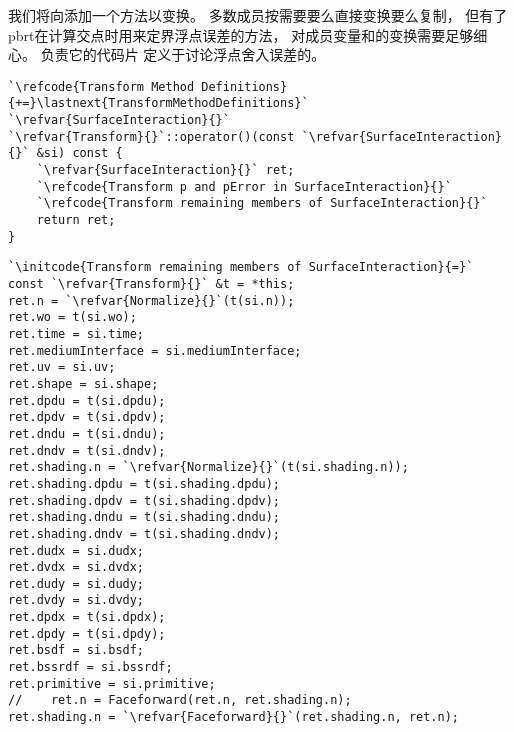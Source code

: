 我们将向添加一个方法以变换。
多数成员按需要要么直接变换要么复制，
但有了pbrt在计算交点时用来定界浮点误差的方法，
对成员变量和的变换需要足够细心。
负责它的代码片
定义于讨论浮点舍入误差的。
\begin{lstlisting}
`\refcode{Transform Method Definitions}{+=}\lastnext{TransformMethodDefinitions}`
`\refvar{SurfaceInteraction}{}`
`\refvar{Transform}{}`::operator()(const `\refvar{SurfaceInteraction}{}` &si) const {
    `\refvar{SurfaceInteraction}{}` ret;
    `\refcode{Transform p and pError in SurfaceInteraction}{}`
    `\refcode{Transform remaining members of SurfaceInteraction}{}`
    return ret; 
}
\end{lstlisting}
\begin{lstlisting}
`\initcode{Transform remaining members of SurfaceInteraction}{=}`
const `\refvar{Transform}{}` &t = *this;
ret.n = `\refvar{Normalize}{}`(t(si.n));
ret.wo = t(si.wo);
ret.time = si.time;
ret.mediumInterface = si.mediumInterface;
ret.uv = si.uv;
ret.shape = si.shape;
ret.dpdu = t(si.dpdu);
ret.dpdv = t(si.dpdv);
ret.dndu = t(si.dndu);
ret.dndv = t(si.dndv);
ret.shading.n = `\refvar{Normalize}{}`(t(si.shading.n));
ret.shading.dpdu = t(si.shading.dpdu);
ret.shading.dpdv = t(si.shading.dpdv);
ret.shading.dndu = t(si.shading.dndu);
ret.shading.dndv = t(si.shading.dndv);
ret.dudx = si.dudx;
ret.dvdx = si.dvdx;
ret.dudy = si.dudy;
ret.dvdy = si.dvdy;
ret.dpdx = t(si.dpdx);
ret.dpdy = t(si.dpdy);
ret.bsdf = si.bsdf;
ret.bssrdf = si.bssrdf;
ret.primitive = si.primitive;
//    ret.n = Faceforward(ret.n, ret.shading.n);
ret.shading.n = `\refvar{Faceforward}{}`(ret.shading.n, ret.n);
\end{lstlisting}